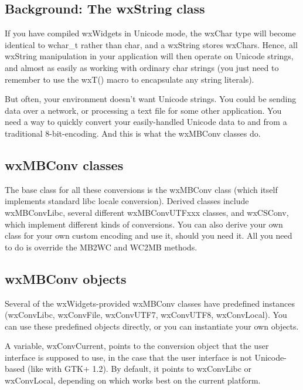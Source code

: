 \subsection{Background: The wxString class}\label{conversionandwxstring}

If you have compiled wxWidgets in Unicode mode, the wxChar type will become
identical to wchar\_t rather than char, and a wxString stores wxChars. Hence,
all wxString manipulation in your application will then operate on Unicode
strings, and almost as easily as working with ordinary char strings (you
just need to remember to use the wxT() macro to encapsulate any string
literals).

But often, your environment doesn't want Unicode strings. You could be sending
data over a network, or processing a text file for some other application. You
need a way to quickly convert your easily-handled Unicode data to and from a
traditional 8-bit-encoding. And this is what the wxMBConv classes do.

\subsection{wxMBConv classes}\label{wxmbconvclasses}

The base class for all these conversions is the wxMBConv class (which itself
implements standard libc locale conversion). Derived classes include
wxMBConvLibc, several different wxMBConvUTFxxx classes, and wxCSConv, which
implement different kinds of conversions. You can also derive your own class
for your own custom encoding and use it, should you need it. All you need to do
is override the MB2WC and WC2MB methods.

\subsection{wxMBConv objects}\label{wxmbconvobjects}

Several of the wxWidgets-provided wxMBConv classes have predefined instances
(wxConvLibc, wxConvFile, wxConvUTF7, wxConvUTF8, wxConvLocal). You can use
these predefined objects directly, or you can instantiate your own objects.

A variable, wxConvCurrent, points to the conversion object that the user
interface is supposed to use, in the case that the user interface is not
Unicode-based (like with GTK+ 1.2). By default, it points to wxConvLibc or
wxConvLocal, depending on which works best on the current platform.

